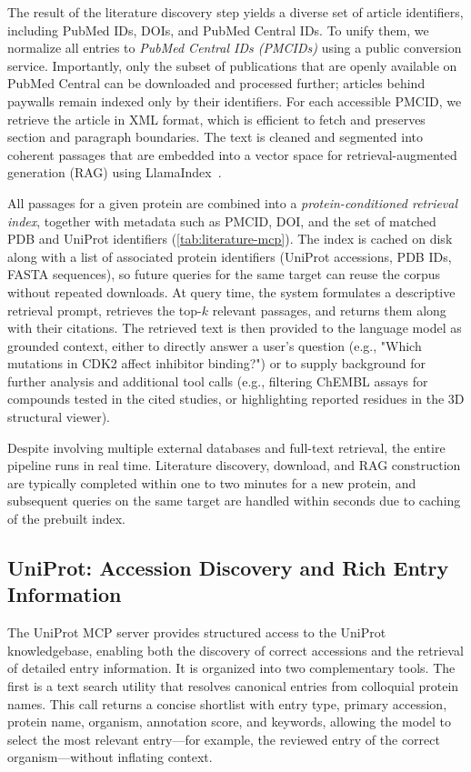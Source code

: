 \documentclass{article}
\begin{document}
The result of the literature discovery step yields a diverse set of article identifiers, including PubMed IDs, DOIs, and PubMed Central IDs. To unify them, we normalize all entries to \emph{PubMed Central IDs (PMCIDs)} using a public conversion service. Importantly, only the subset of publications that are openly available on PubMed Central can be downloaded and processed further; articles behind paywalls remain indexed only by their identifiers. For each accessible PMCID, we retrieve the article in XML format, which is efficient to fetch and preserves section and paragraph boundaries. The text is cleaned and segmented into coherent passages that are embedded into a vector space for retrieval-augmented generation (RAG) using LlamaIndex~\citep{Liu_LlamaIndex_2022}.

All passages for a given protein are combined into a \emph{protein-conditioned retrieval index}, together with metadata such as PMCID, DOI, and the set of matched PDB and UniProt identifiers (\cref{tab:literature-mcp}). The index is cached on disk along with a list of associated protein identifiers (UniProt accessions, PDB IDs, FASTA sequences), so future queries for the same target can reuse the corpus without repeated downloads. At query time, the system formulates a descriptive retrieval prompt, retrieves the top-$k$ relevant passages, and returns them along with their citations. The retrieved text is then provided to the language model as grounded context, either to directly answer a user's question (e.g., "Which mutations in CDK2 affect inhibitor binding?") or to supply background for further analysis and additional tool calls (e.g., filtering ChEMBL assays for compounds tested in the cited studies, or highlighting reported residues in the 3D structural viewer).

Despite involving multiple external databases and full-text retrieval, the entire pipeline runs in real time. Literature discovery, download, and RAG construction are typically completed within one to two minutes for a new protein, and subsequent queries on the same target are handled within seconds due to caching of the prebuilt index.




\subsection{UniProt: Accession Discovery and Rich Entry Information}\label{sec:data:uniprot}
The UniProt MCP server provides structured access to the UniProt knowledgebase, enabling both the discovery of correct accessions and the retrieval of detailed entry information. It is organized into two complementary tools. The first is a text search utility that resolves canonical entries from colloquial protein names. This call returns a concise shortlist with entry type, primary accession, protein name, organism, annotation score, and keywords, allowing the model to select the most relevant entry—for example, the reviewed entry of the correct organism—without inflating context.
\end{document}
